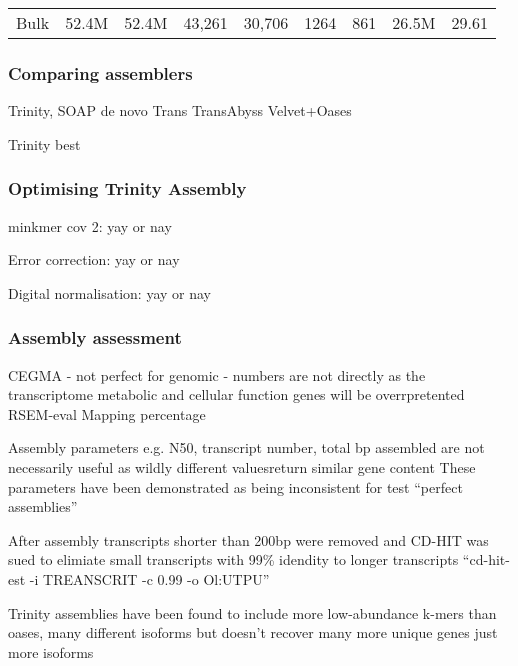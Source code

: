 \begin{table}[h]
\begin{tabular}{|l|rrrrrrrl}
Bulk                           & 52.4M                                   & 52.4M                                                                                               & 43,261                                 & 30,706                                 & 1264                            & 861                                     & 26.5M                                             & 29.61                     \\ \cline{1-1}
\end{tabular}
\end{table}



\subsubsection{Comparing assemblers}
Trinity,
SOAP de novo Trans
TransAbyss
Velvet+Oases

Trinity best

\subsubsection{Optimising Trinity Assembly}

minkmer cov 2: yay or nay

Error correction: yay or nay

Digital normalisation: yay or nay

\subsubsection{Assembly assessment}
CEGMA - not perfect for genomic - numbers are not directly as the transcriptome metabolic and cellular function
genes will be overrpretented 
RSEM-eval
Mapping percentage


Assembly parameters e.g. N50, transcript number, total bp assembled are not necessarily useful
as wildly different valuesreturn similar gene content \citep{Lowe2014}
These parameters have been demonstrated as being inconsistent for test ``perfect assemblies'' 





After assembly transcripts shorter than 200bp were removed and CD-HIT was sued to elimiate small 
transcripts with 99\% idendity to longer transcripts  ``cd-hit-est -i TREANSCRIT -c 0.99 -o Ol:UTPU''


Trinity assemblies have been found to include more low-abundance k-mers than oases, many different isoforms
but doesn't recover many more unique genes just more isoforms \citep{Lowe2014} 

